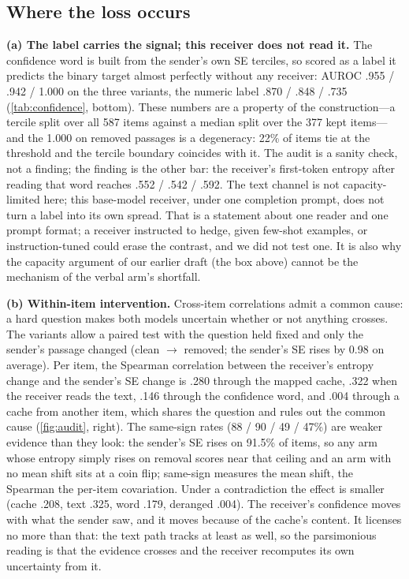 \documentclass{article}
\begin{document}
\subsection{Where the loss occurs}
\label{app:where}

\textbf{(a) The label carries the signal; this receiver does not read it.} The confidence word is built from the sender's own SE terciles, so scored as a label it predicts the binary target almost perfectly without any receiver: AUROC .955 / .942 / 1.000 on the three variants, the numeric label .870 / .848 / .735 (\cref{tab:confidence}, bottom). These numbers are a property of the construction---a tercile split over all 587 items against a median split over the 377 kept items---and the 1.000 on removed passages is a degeneracy: 22\% of items tie at the threshold and the tercile boundary coincides with it. The audit is a sanity check, not a finding; the finding is the other bar: the receiver's first-token entropy after reading that word reaches .552 / .542 / .592. The text channel is not capacity-limited here; this base-model receiver, under one completion prompt, does not turn a label into its own spread. That is a statement about one reader and one prompt format; a receiver instructed to hedge, given few-shot examples, or instruction-tuned could erase the contrast, and we did not test one. It is also why the capacity argument of our earlier draft (the box above) cannot be the mechanism of the verbal arm's shortfall.

\textbf{(b) Within-item intervention.} Cross-item correlations admit a common cause: a hard question makes both models uncertain whether or not anything crosses. The variants allow a paired test with the question held fixed and only the sender's passage changed (clean $\rightarrow$ removed; the sender's SE rises by 0.98 on average). Per item, the Spearman correlation between the receiver's entropy change and the sender's SE change is .280 through the mapped cache, .322 when the receiver reads the text, .146 through the confidence word, and .004 through a cache from another item, which shares the question and rules out the common cause (\cref{fig:audit}, right). The same-sign rates (88 / 90 / 49 / 47\%) are weaker evidence than they look: the sender's SE rises on 91.5\% of items, so any arm whose entropy simply rises on removal scores near that ceiling and an arm with no mean shift sits at a coin flip; same-sign measures the mean shift, the Spearman the per-item covariation. Under a contradiction the effect is smaller (cache .208, text .325, word .179, deranged .004). The receiver's confidence moves with what the sender saw, and it moves because of the cache's content. It licenses no more than that: the text path tracks at least as well, so the parsimonious reading is that the evidence crosses and the receiver recomputes its own uncertainty from it.
\end{document}
